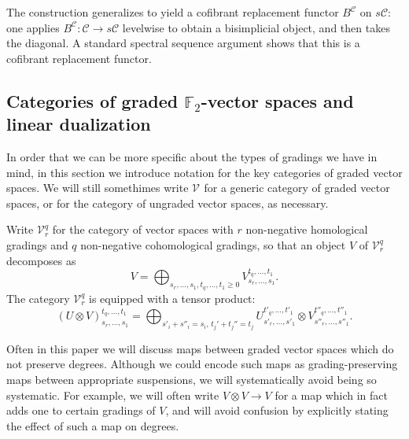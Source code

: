 \documentclass[11pt]{amsart}
\theoremstyle{plain}
\theoremstyle{definition}
\renewcommand{\to}{\longrightarrow}
\newcommand{\calV}{\mathcal{V}}
\newcommand{\calc}{\mathcal{C}}
\theoremstyle{plain}
\newcommand{\vect}[2]{\calV^{#1}_{#2}}
\newcommand{\F}{\mathbb{F}}
\newcommand{\Ftwo}{\F_2}
\begin{document}
\begin{Conventions and notation}
The construction generalizes to yield a cofibrant replacement functor $B^{\calc}$ on $s\calc$: one applies  $B^{\calc}:\calc\to s\calc$ levelwise to obtain a bisimplicial object, and then takes the diagonal. A standard spectral sequence argument shows that this is a cofibrant replacement functor.

\subsection{Categories of graded $\Ftwo $-vector spaces and linear dualization}
In order that we can be more specific about the types of gradings we have in mind, in this section we introduce  notation for the key categories of graded vector spaces. We will still somethimes write $\vect{}{}$ for a generic category of graded vector spaces, or for the category of ungraded vector spaces, as necessary.

Write $\vect{q}{r}$ for the category of vector spaces with $r$ non-negative homological gradings and $q$ non-negative cohomological gradings, so that an object $V$ of $\vect{q}{r}$ decomposes as
\[V=\bigoplus_{s_r,\ldots,s_1,t_q,\ldots,t_1\geq0}V^{t_q,\ldots,t_1}_{s_r,\ldots,s_1}.\]
The category $\vect{q}{r}$ is equipped with a tensor product:
\[(U\otimes V)^{t_q,\ldots,t_1}_{s_r,\ldots,s_1}=\bigoplus_{s'_i+s''_i=s_i,\,t_j'+t_j''=t_j}U^{t'_q,\ldots,t'_1}_{s'_r,\ldots,s'_1}\otimes V^{t''_q,\ldots,t''_1}_{s''_r,\ldots,s''_1}.\]

Often in this paper we will discuss maps between graded vector spaces which do not preserve degrees. %
Although we could encode such maps as grading-preserving maps between appropriate suspensions, we will systematically avoid being so systematic. For example, we will often write $V\otimes V\to V$ for a map which in fact adds one to certain gradings of $V$, and will avoid confusion by explicitly stating the effect of such a map on degrees.


\end{Conventions and notation}
\end{document}
